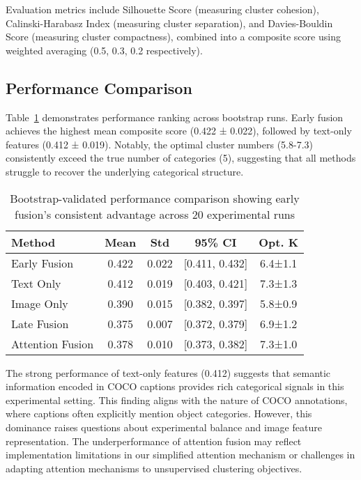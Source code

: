 \documentclass[sigconf]{acmart}
\begin{document}
Evaluation metrics include Silhouette Score (measuring cluster cohesion), Calinski-Harabasz Index (measuring cluster separation), and Davies-Bouldin Score (measuring cluster compactness), combined into a composite score using weighted averaging (0.5, 0.3, 0.2 respectively).

\subsection{Performance Comparison}

Table~\ref{tab:performance} demonstrates performance ranking across bootstrap runs. Early fusion achieves the highest mean composite score (0.422 ± 0.022), followed by text-only features (0.412 ± 0.019). Notably, the optimal cluster numbers (5.8-7.3) consistently exceed the true number of categories (5), suggesting that all methods struggle to recover the underlying categorical structure.

\begin{table}[h!]
\centering
\small
\caption{Bootstrap-validated performance comparison showing early fusion's consistent advantage across 20 experimental runs}
\label{tab:performance}
\begin{tabular}{@{}lcccc@{}}
\toprule
\textbf{Method} & \textbf{Mean} & \textbf{Std} & \textbf{95\% CI} & \textbf{Opt. K} \\
\midrule
Early Fusion & 0.422 & 0.022 & [0.411, 0.432] & 6.4±1.1 \\
Text Only & 0.412 & 0.019 & [0.403, 0.421] & 7.3±1.3 \\
Image Only & 0.390 & 0.015 & [0.382, 0.397] & 5.8±0.9 \\
Late Fusion & 0.375 & 0.007 & [0.372, 0.379] & 6.9±1.2 \\
Attention Fusion & 0.378 & 0.010 & [0.373, 0.382] & 7.3±1.0 \\
\bottomrule
\end{tabular}
\end{table}

The strong performance of text-only features (0.412) suggests that semantic information encoded in COCO captions provides rich categorical signals in this experimental setting. This finding aligns with the nature of COCO annotations, where captions often explicitly mention object categories. However, this dominance raises questions about experimental balance and image feature representation. The underperformance of attention fusion may reflect implementation limitations in our simplified attention mechanism or challenges in adapting attention mechanisms to unsupervised clustering objectives.
\end{document}
